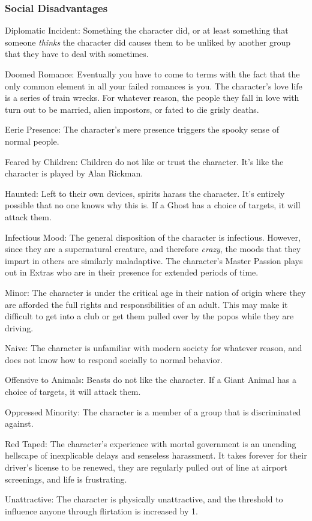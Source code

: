 \subsubsection{Social Disadvantages}

\begin{description*}
\item[Diplomatic Incident:] Something the character did, or at least something that someone \textit{thinks} the character did causes them to be unliked by another group that they have to deal with sometimes.
\item[Doomed Romance:] Eventually you have to come to terms with the fact that the only common element in all your failed romances is you. The character's love life is a series of train wrecks. For whatever reason, the people they fall in love with turn out to be married, alien impostors, or fated to die grisly deaths.
\item[Eerie Presence:] The character's mere presence triggers the spooky sense of normal people.
\item[Feared by Children:] Children do not like or trust the character. It's like the character is played by Alan Rickman.
\item[Haunted:] Left to their own devices, spirits harass the character. It's entirely possible that no one knows why this is. If a Ghost has a choice of targets, it will attack them.
\item[Infectious Mood:] The general disposition of the character is infectious. However, since they are a supernatural creature, and therefore \textit{crazy}, the moods that they impart in others are similarly maladaptive. The character's Master Passion plays out in Extras who are in their presence for extended periods of time.
\item[Minor:] The character is under the critical age in their nation of origin where they are afforded the full rights and responsibilities of an adult. This may make it difficult to get into a club or get them pulled over by the popos while they are driving.
\item[Naive:] The character is unfamiliar with modern society for whatever reason, and does not know how to respond socially to normal behavior.
\item[Offensive to Animals:] Beasts do not like the character. If a Giant Animal has a choice of targets, it will attack them.
\item[Oppressed Minority:] The character is a member of a group that is discriminated against.
\item[Red Taped:] The character's experience with mortal government is an unending hellscape of inexplicable delays and senseless harassment. It takes forever for their driver's license to be renewed, they are regularly pulled out of line at airport screenings, and life is frustrating.
\item[Unattractive:] The character is physically unattractive, and the threshold to influence anyone through flirtation is increased by 1.
\end{description*}


